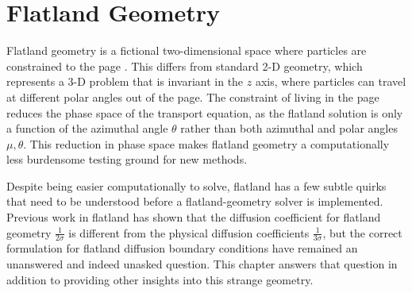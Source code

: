 
\chapter{Flatland Geometry}

Flatland geometry is a fictional two-dimensional space where particles are
constrained to the page \cite{Abb1884,Asa2008}. This differs from standard 2-D
geometry, which represents a 3-D problem that is invariant in the $z$ axis,
where particles can travel at different polar angles out of the page. The
constraint of living in the page reduces the phase space of the transport
equation, as the flatland solution is only a function of the azimuthal angle
$\theta$
rather than both azimuthal and polar angles $\mu,\theta$. This reduction in
phase space makes 
flatland geometry a computationally less burdensome testing ground for new
methods.

Despite being easier computationally to solve, flatland has a few subtle quirks
that need to be understood before a flatland-geometry solver is implemented.
Previous work in flatland \cite{Asa2008,Lar2009c} has shown that the
diffusion coefficient for flatland geometry $\frac{1}{2\sigma}$ is different from
the physical diffusion coefficients $\frac{1}{3\sigma}$, but the correct
formulation for flatland diffusion boundary
conditions have remained an unanswered and indeed unasked question. This
chapter answers that question in addition to providing other insights into this
strange geometry.

